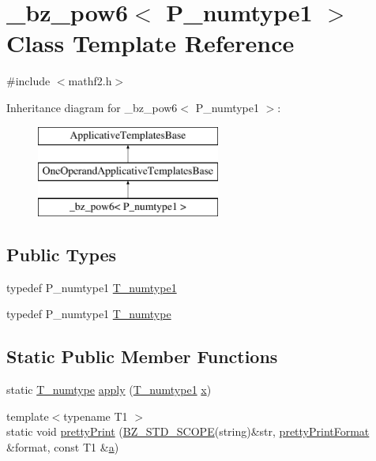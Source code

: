\hypertarget{class__bz__pow6}{}\section{\+\_\+bz\+\_\+pow6$<$ P\+\_\+numtype1 $>$ Class Template Reference}
\label{class__bz__pow6}


{\ttfamily \#include $<$mathf2.\+h$>$}

Inheritance diagram for \+\_\+bz\+\_\+pow6$<$ P\+\_\+numtype1 $>$\+:\begin{figure}[H]
\begin{center}
\leavevmode
\includegraphics[height=3.000000cm]{class__bz__pow6}
\end{center}
\end{figure}
\subsection*{Public Types}
\begin{DoxyCompactItemize}
\item 
typedef P\+\_\+numtype1 \hyperlink{class__bz__pow6_ae659483cf78669bdb45c28f89af9a987}{T\+\_\+numtype1}
\item 
typedef P\+\_\+numtype1 \hyperlink{class__bz__pow6_aad3d4faceaf3066a7d92c4c1be07dbe1}{T\+\_\+numtype}
\end{DoxyCompactItemize}
\subsection*{Static Public Member Functions}
\begin{DoxyCompactItemize}
\item 
static \hyperlink{class__bz__pow6_aad3d4faceaf3066a7d92c4c1be07dbe1}{T\+\_\+numtype} \hyperlink{class__bz__pow6_ae41582050066a7e41c2348d8e664d81d}{apply} (\hyperlink{class__bz__pow6_ae659483cf78669bdb45c28f89af9a987}{T\+\_\+numtype1} \hyperlink{vecnorm1_8cc_ac73eed9e41ec09d58f112f06c2d6cb63}{x})
\item 
{\footnotesize template$<$typename T1 $>$ }\\static void \hyperlink{class__bz__pow6_a725b07322e2176ff31cd4a0ccba328d8}{pretty\+Print} (\hyperlink{numinquire_8h_a2b24ffc3b4ef9803956bc7715c6c7b83}{B\+Z\+\_\+\+S\+T\+D\+\_\+\+S\+C\+O\+P\+E}(string)\&str, \hyperlink{classprettyPrintFormat}{pretty\+Print\+Format} \&format, const T1 \&\hyperlink{gen__mat5files_8m_aae328bf20413f220e38aec4d95bfd6da}{a})
\end{DoxyCompactItemize}


